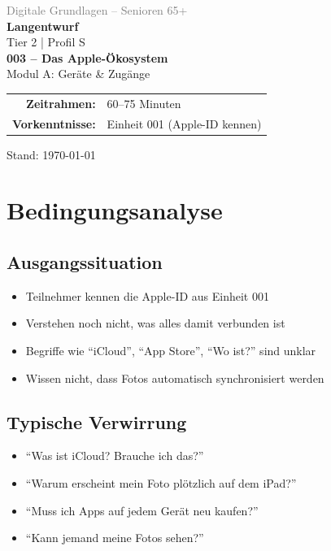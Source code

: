 \documentclass[11pt,a4paper]{article}
\begin{document}
\begin{titlepage}
    \centering
    \vspace*{2cm}
    {\Large\textcolor{gray}{Digitale Grundlagen -- Senioren 65+}}\\[2cm]
    {\Huge\textcolor{fach}{\textbf{Langentwurf}}}\\[0.5cm]
    {\large Tier 2 | Profil S}\\[2cm]
    {\LARGE\textbf{003 -- Das Apple-Ökosystem}}\\[0.5cm]
    {\large Modul A: Geräte \& Zugänge}\\[2cm]
    \begin{tabular}{rl}
        \textbf{Zeitrahmen:} & 60--75 Minuten \\
        \textbf{Vorkenntnisse:} & Einheit 001 (Apple-ID kennen) \\
    \end{tabular}
    \vfill
    {\normalsize Stand: \today}
\end{titlepage}

\tableofcontents
\newpage

\section{Bedingungsanalyse}

\subsection{Ausgangssituation}
\begin{itemize}
    \item Teilnehmer kennen die Apple-ID aus Einheit 001
    \item Verstehen noch nicht, was alles damit verbunden ist
    \item Begriffe wie ``iCloud'', ``App Store'', ``Wo ist?'' sind unklar
    \item Wissen nicht, dass Fotos automatisch synchronisiert werden
\end{itemize}

\subsection{Typische Verwirrung}
\begin{itemize}
    \item ``Was ist iCloud? Brauche ich das?''
    \item ``Warum erscheint mein Foto plötzlich auf dem iPad?''
    \item ``Muss ich Apps auf jedem Gerät neu kaufen?''
    \item ``Kann jemand meine Fotos sehen?''
\end{itemize}
\end{document}
